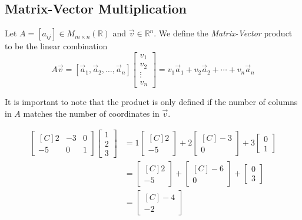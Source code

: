 

\subsection{Matrix-Vector Multiplication}

\begin{definition}
Let $A=[a_{ij}]\in M_{m\times n}(\mathbb{R})$ and $\vec{v} \in \mathbb{R}^n$.  
We define the \emph{Matrix-Vector} product to be the linear combination 
\[
A\vec{v}=[\vec{a}_1, \vec{a}_2, \ldots ,\vec{a}_n]\begin{bmatrix}v_1 \\ v_2 \\ 
\vdots \\ v_n \end{bmatrix}=v_1\vec{a}_1+v_2\vec{a}_2+\cdots+v_n\vec{a}_n
\]
\end{definition} 
\begin{remark}
It is important to note that the product is only defined if the number of columns in $A$ matches the number of coordinates in $\vec{v}$.
\end{remark}

\begin{example}
\begin{align*}
\begin{bmatrix*}[C]
2 & -3 & 0 \\
-5 & 0 & 1 
\end{bmatrix*} 
\begin{bmatrix}1\\ 2 \\ 3 \end{bmatrix}
&=1\begin{bmatrix*}[C]2\\-5\end{bmatrix*} 
+2\begin{bmatrix*}[C]-3\\0\end{bmatrix*} 
+3\begin{bmatrix}0\\1\end{bmatrix}\\
&=\begin{bmatrix*}[C]2\\-5\end{bmatrix*}
+\begin{bmatrix*}[C]-6\\0\end{bmatrix*}+\begin{bmatrix}0\\3\end{bmatrix}\\
&=\begin{bmatrix*}[C]-4\\-2\end{bmatrix*}
\end{align*}
\end{example}

